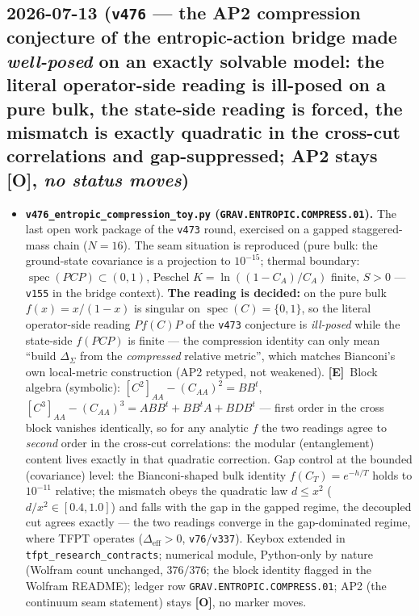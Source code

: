 \documentclass[11pt]{article}
\providecommand{\mE}{\textbf{[E]}}\providecommand{\mC}{\textbf{[C]}}
\providecommand{\mO}{\textbf{[O]}}\providecommand{\mX}{\textbf{[X]}}
\begin{document}
\subsection*{2026-07-13 (\texttt{v476} --- the AP2 compression conjecture of the entropic-action bridge made \emph{well-posed} on an exactly solvable model: the literal operator-side reading is ill-posed on a pure bulk, the state-side reading is forced, the mismatch is exactly quadratic in the cross-cut correlations and gap-suppressed; AP2 stays \mO, \emph{no status moves})}
\begin{itemize}[leftmargin=1.5em]
\item \textbf{\texttt{v476\_entropic\_compression\_toy.py} (\texttt{GRAV.ENTROPIC.COMPRESS.01}).} The last
open work package of the \texttt{v473} round, exercised on a gapped staggered-mass chain ($N{=}16$).
The seam situation is reproduced (pure bulk: the ground-state covariance is a projection to $10^{-15}$;
thermal boundary: $\operatorname{spec}(PCP)\subset(0,1)$, Peschel $K{=}\ln((1{-}C_A)/C_A)$ finite,
$S{>}0$ --- \texttt{v155} in the bridge context). \textbf{The reading is decided:} on the pure bulk
$f(x){=}x/(1{-}x)$ is singular on $\operatorname{spec}(C){=}\{0,1\}$, so the literal operator-side
reading $P f(C) P$ of the \texttt{v473} conjecture is \emph{ill-posed} while the state-side $f(PCP)$ is
finite --- the compression identity can only mean ``build $\Delta_\Sigma$ from the \emph{compressed}
relative metric'', which matches Bianconi's own local-metric construction (AP2 retyped, not weakened).
\mE\ Block algebra (symbolic): $[C^2]_{AA}{-}(C_{AA})^2{=}BB^t$, $[C^3]_{AA}{-}(C_{AA})^3{=}ABB^t{+}
BB^tA{+}BDB^t$ --- first order in the cross block vanishes identically, so for any analytic $f$ the two
readings agree to \emph{second} order in the cross-cut correlations: the modular (entanglement) content
lives exactly in that quadratic correction. Gap control at the bounded (covariance) level: the
Bianconi-shaped bulk identity $f(C_T){=}e^{-h/T}$ holds to $10^{-11}$ relative; the mismatch obeys the
quadratic law $d\le x^2$ ($d/x^2\in[0.4,1.0]$) and falls with the gap in the gapped regime, the
decoupled cut agrees exactly --- the two readings converge in the gap-dominated regime, where TFPT
operates ($\Delta_{\mathrm{eff}}{>}0$, \texttt{v76}/\texttt{v337}). Keybox extended in
\texttt{tfpt\_research\_contracts}; numerical module, Python-only by nature (Wolfram count unchanged,
$376/376$; the block identity flagged in the Wolfram README); ledger row
\texttt{GRAV.ENTROPIC.COMPRESS.01}; AP2 (the continuum seam statement) stays \mO, no marker moves.
\end{itemize}
\end{document}
